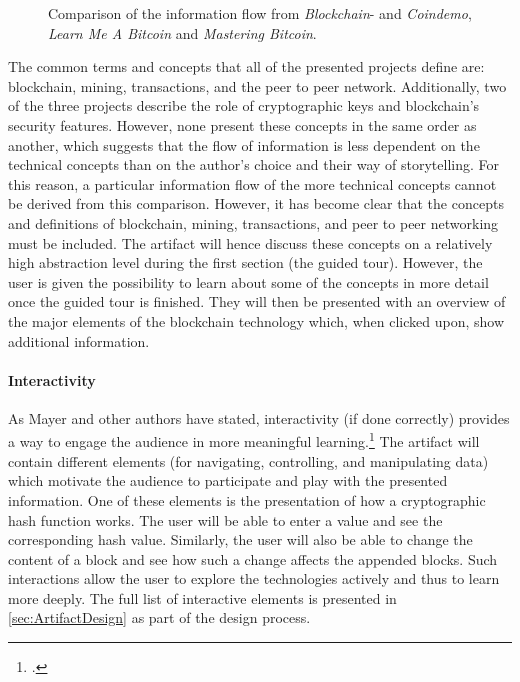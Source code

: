 \begin{figure}
    \centering
    
    \caption{Comparison of the information flow from \textit{Blockchain}- and \textit{Coindemo}, \textit{Learn Me A Bitcoin} and \textit{Mastering Bitcoin}.}
    \label{fig:ProcessBC}
\end{figure}

The common terms and concepts that all of the presented projects define are: blockchain, mining, transactions, and the peer to peer network. Additionally, two of the three projects describe the role of cryptographic keys and blockchain's security features. However, none present these concepts in the same order as another, which suggests that the flow of information is less dependent on the technical concepts than on the author's choice and their way of storytelling. For this reason, a particular information flow of the more technical concepts cannot be derived from this comparison. However, it has become clear that the concepts and definitions of blockchain, mining, transactions, and peer to peer networking must be included. The artifact will hence discuss these concepts on a relatively high abstraction level during the first section (the guided tour). However, the user is given the possibility to learn about some of the concepts in more detail once the guided tour is finished. They will then be presented with an overview of the major elements of the blockchain technology which, when clicked upon, show additional information. 

\paragraph{Interactivity} As Mayer and other authors have stated, interactivity (if done correctly) provides a way to engage the audience in more meaningful learning.\footcites[Cf.][p.310]{MorenoInteractiveMultimodalLearning2007}[cf.][p.160]{ZhangInteractiveMultimediaBasedELearning2005}[cf.][p.190]{LeeScreenDesignGuidelines1999} The artifact will contain different elements (for navigating, controlling, and manipulating data) which motivate the audience to participate and play with the presented information. One of these elements is the presentation of how a cryptographic hash function works. The user will be able to enter a value and see the corresponding hash value. Similarly, the user will also be able to change the content of a block and see how such a change affects the appended blocks. Such interactions allow the user to explore the technologies actively and thus to learn more deeply. The full list of interactive elements is presented in \ref{sec:ArtifactDesign} as part of the design process. 

